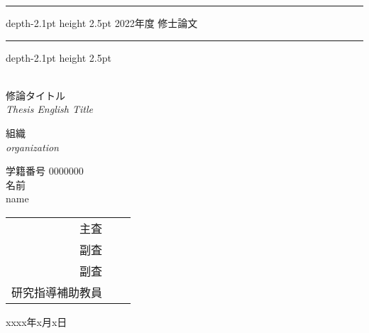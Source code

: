 \newcommand{\titleja}{修論タイトル}
\newcommand{\titleen}{Thesis English Title}
\newcommand{\orgja}{組織}
\newcommand{\orgen}{organization}
\newcommand{\studentnum}{0000000}
\newcommand{\nameja}{名前}
\newcommand{\nameen}{name}
\newcommand{\publishedat}{xxxx年x月x日}

\renewcommand{\hrulefill}{\leavevmode%
    \leaders\hrule depth-2.1pt height 2.5pt\hfill\kern0pt
}
\renewcommand{\arraystretch}{1.3}
\begin{titlepage}
    \begin{center}
        \vspace{100truept}
        {\large \hspace*{\fill}\hrulefill2022年度 修士論文\hrulefill\hspace*{\fill}} \\
        \vspace{100truept}
        {\Large \titleja}  \\
        \vspace{10truept}
        {\large{\textit{\titleen}}}  \\
        \vspace{100truept}

        {\large \orgja} \\
        \vspace{10truept}
        {\large \textit{\orgen}} \\
        \vspace{30truept}

        {\large 学籍番号 \studentnum} \\
        \vspace{10truept}
        {\large \nameja} \\
        \vspace{10truept}
        {\large \nameen} \\
        \vspace{50truept}

        \begin{table}[h]
            \centering
            \begin{tabular}{rrr}
                主査       &               &  \\
                副査       &                    &     \\
                副査       &                    &     \\
                研究指導補助教員 &  & \\
            \end{tabular}
        \end{table}

        \vspace{50truept}

        \publishedat
    \end{center}
\end{titlepage}

\renewcommand{\arraystretch}{1}